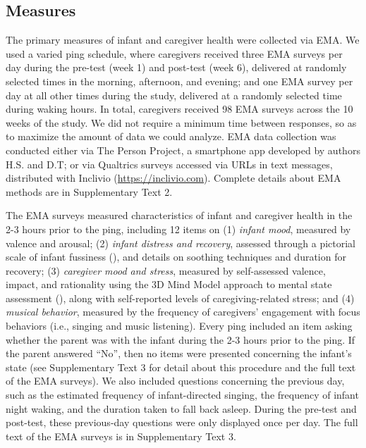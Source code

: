 \documentclass[
]{article}
\begin{document}
\subsection{Measures}\label{measures}

The primary measures of infant and caregiver health were collected via
EMA. We used a varied ping schedule, where caregivers received three EMA
surveys per day during the pre-test (week 1) and post-test (week 6),
delivered at randomly selected times in the morning, afternoon, and
evening; and one EMA survey per day at all other times during the study,
delivered at a randomly selected time during waking hours. In total,
caregivers received 98 EMA surveys across the 10 weeks of the study. We
did not require a minimum time between responses, so as to maximize the
amount of data we could analyze. EMA data collection was conducted
either via The Person Project, a smartphone app developed by authors
H.S. and D.T; or via Qualtrics surveys accessed via URLs in text
messages, distributed with Inclivio (\url{https://inclivio.com}).
Complete details about EMA methods are in Supplementary Text 2.

The EMA surveys measured characteristics of infant and caregiver health
in the 2-3 hours prior to the ping, including 12 items on (1)
\emph{infant mood}, measured by valence and arousal; (2) \emph{infant
distress and recovery}, assessed through a pictorial scale of infant
fussiness (), and details on
soothing techniques and duration for recovery; (3) \emph{caregiver mood
and stress}, measured by self-assessed valence, impact, and rationality
using the 3D Mind Model approach to mental state assessment
(), along with
self-reported levels of caregiving-related stress; and (4) \emph{musical
behavior}, measured by the frequency of caregivers' engagement with
focus behaviors (i.e., singing and music listening). Every ping included
an item asking whether the parent was with the infant during the 2-3
hours prior to the ping. If the parent answered ``No'', then no items
were presented concerning the infant's state (see Supplementary Text 3
for detail about this procedure and the full text of the EMA surveys).
We also included questions concerning the previous day, such as the
estimated frequency of infant-directed singing, the frequency of infant
night waking, and the duration taken to fall back asleep. During the
pre-test and post-test, these previous-day questions were only displayed
once per day. The full text of the EMA surveys is in Supplementary Text
3.
\end{document}
